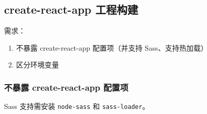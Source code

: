 \subsection{create-react-app
工程构建}\label{create-react-app-ux5de5ux7a0bux6784ux5efa}

需求：

\begin{enumerate}
\def\labelenumi{\arabic{enumi}.}
\tightlist
\item
  不暴露 create-react-app 配置项（并支持 Sass、支持热加载）
\item
  区分环境变量
\end{enumerate}

\subsubsection{不暴露 create-react-app
配置项}\label{ux4e0dux66b4ux9732-create-react-app-ux914dux7f6eux9879}

Sass 支持需安装 \lstinline!node-sass! 和 \lstinline!sass-loader!。

